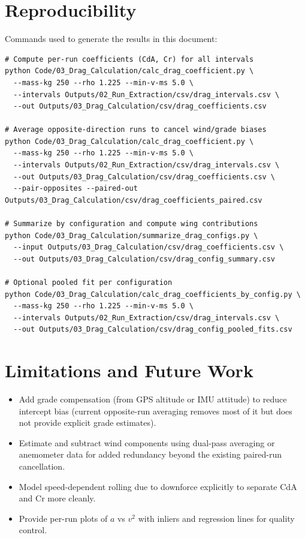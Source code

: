 \documentclass[11pt,a4paper]{article}
\begin{document}
\section{Reproducibility}
Commands used to generate the results in this document:
\begin{verbatim}
# Compute per-run coefficients (CdA, Cr) for all intervals
python Code/03_Drag_Calculation/calc_drag_coefficient.py \
  --mass-kg 250 --rho 1.225 --min-v-ms 5.0 \
  --intervals Outputs/02_Run_Extraction/csv/drag_intervals.csv \
  --out Outputs/03_Drag_Calculation/csv/drag_coefficients.csv

# Average opposite-direction runs to cancel wind/grade biases
python Code/03_Drag_Calculation/calc_drag_coefficient.py \
  --mass-kg 250 --rho 1.225 --min-v-ms 5.0 \
  --intervals Outputs/02_Run_Extraction/csv/drag_intervals.csv \
  --out Outputs/03_Drag_Calculation/csv/drag_coefficients.csv \
  --pair-opposites --paired-out Outputs/03_Drag_Calculation/csv/drag_coefficients_paired.csv

# Summarize by configuration and compute wing contributions
python Code/03_Drag_Calculation/summarize_drag_configs.py \
  --input Outputs/03_Drag_Calculation/csv/drag_coefficients.csv \
  --out Outputs/03_Drag_Calculation/csv/drag_config_summary.csv

# Optional pooled fit per configuration
python Code/03_Drag_Calculation/calc_drag_coefficients_by_config.py \
  --mass-kg 250 --rho 1.225 --min-v-ms 5.0 \
  --intervals Outputs/02_Run_Extraction/csv/drag_intervals.csv \
  --out Outputs/03_Drag_Calculation/csv/drag_config_pooled_fits.csv
\end{verbatim}

\section{Limitations and Future Work}
\begin{itemize}
  \item Add grade compensation (from GPS altitude or IMU attitude) to reduce intercept bias (current opposite-run averaging removes most of it but does not provide explicit grade estimates).
  \item Estimate and subtract wind components using dual-pass averaging or anemometer data for added redundancy beyond the existing paired-run cancellation.
  \item Model speed-dependent rolling due to downforce explicitly to separate CdA and Cr more cleanly.
  \item Provide per-run plots of $a$ vs $v^2$ with inliers and regression lines for quality control.
\end{itemize}
\end{document}
